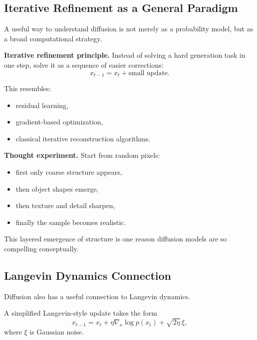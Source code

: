\subsection{Iterative Refinement as a General Paradigm}

A useful way to understand diffusion is not merely as a probability model, but as a broad computational strategy.

\medskip

\noindent
\textbf{Iterative refinement principle.}
Instead of solving a hard generation task in one step, solve it as a sequence of easier corrections:
\[
x_{t-1}=x_t+\text{small update}.
\]

\medskip

\noindent
This resembles:
\begin{itemize}
    \item residual learning,
    \item gradient-based optimization,
    \item classical iterative reconstruction algorithms.
\end{itemize}

\medskip

\noindent
\textbf{Thought experiment.}
Start from random pixels:
\begin{itemize}
    \item first only coarse structure appears,
    \item then object shapes emerge,
    \item then texture and detail sharpen,
    \item finally the sample becomes realistic.
\end{itemize}

\medskip

\noindent
This layered emergence of structure is one reason diffusion models are so compelling conceptually.

\subsection{Langevin Dynamics Connection}

Diffusion also has a useful connection to Langevin dynamics.

\medskip

\noindent
A simplified Langevin-style update takes the form
\[
x_{t-1}
=
x_t + \eta \nabla_x \log p(x_t) + \sqrt{2\eta}\,\xi,
\]
where $\xi$ is Gaussian noise.

\medskip

